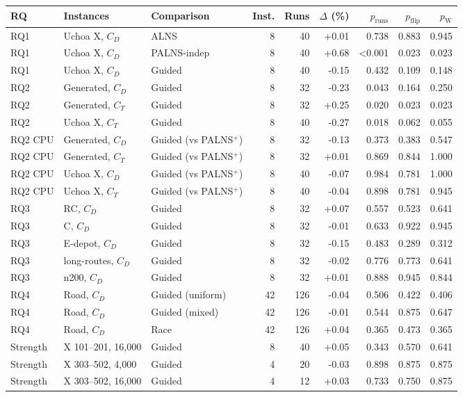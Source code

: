 \begin{tabular}{lllrrrrrr}
\toprule
RQ & Instances & Comparison & Inst. & Runs & $\Delta$ (\%) & $p_{\mathrm{runs}}$ & $p_{\mathrm{flip}}$ & $p_{\mathrm{W}}$ \\
\midrule
RQ1 & Uchoa X, $C_D$ & ALNS & 8 & 40 & +0.01 & 0.738 & 0.883 & 0.945 \\
RQ1 & Uchoa X, $C_D$ & PALNS-indep & 8 & 40 & +0.68 & <0.001 & 0.023 & 0.023 \\
RQ1 & Uchoa X, $C_D$ & Guided & 8 & 40 & -0.15 & 0.432 & 0.109 & 0.148 \\
RQ2 & Generated, $C_D$ & Guided & 8 & 32 & -0.23 & 0.043 & 0.164 & 0.250 \\
RQ2 & Generated, $C_T$ & Guided & 8 & 32 & +0.25 & 0.020 & 0.023 & 0.023 \\
RQ2 & Uchoa X, $C_T$ & Guided & 8 & 40 & -0.27 & 0.018 & 0.062 & 0.055 \\
RQ2 CPU & Generated, $C_D$ & Guided (vs PALNS$^{+}$) & 8 & 32 & -0.13 & 0.373 & 0.383 & 0.547 \\
RQ2 CPU & Generated, $C_T$ & Guided (vs PALNS$^{+}$) & 8 & 32 & +0.01 & 0.869 & 0.844 & 1.000 \\
RQ2 CPU & Uchoa X, $C_D$ & Guided (vs PALNS$^{+}$) & 8 & 40 & -0.07 & 0.984 & 0.781 & 1.000 \\
RQ2 CPU & Uchoa X, $C_T$ & Guided (vs PALNS$^{+}$) & 8 & 40 & -0.04 & 0.898 & 0.781 & 0.945 \\
RQ3 & RC, $C_D$ & Guided & 8 & 32 & +0.07 & 0.557 & 0.523 & 0.641 \\
RQ3 & C, $C_D$ & Guided & 8 & 32 & -0.01 & 0.633 & 0.922 & 0.945 \\
RQ3 & E-depot, $C_D$ & Guided & 8 & 32 & -0.15 & 0.483 & 0.289 & 0.312 \\
RQ3 & long-routes, $C_D$ & Guided & 8 & 32 & -0.02 & 0.776 & 0.773 & 0.641 \\
RQ3 & n200, $C_D$ & Guided & 8 & 32 & +0.01 & 0.888 & 0.945 & 0.844 \\
RQ4 & Road, $C_D$ & Guided (uniform) & 42 & 126 & -0.04 & 0.506 & 0.422 & 0.406 \\
RQ4 & Road, $C_D$ & Guided (mixed) & 42 & 126 & -0.01 & 0.544 & 0.875 & 0.647 \\
RQ4 & Road, $C_D$ & Race & 42 & 126 & +0.04 & 0.365 & 0.473 & 0.365 \\
Strength & X 101--201, 16{,}000 & Guided & 8 & 40 & +0.05 & 0.343 & 0.570 & 0.641 \\
Strength & X 303--502, 4{,}000 & Guided & 4 & 20 & -0.03 & 0.898 & 0.875 & 0.875 \\
Strength & X 303--502, 16{,}000 & Guided & 4 & 12 & +0.03 & 0.733 & 0.750 & 0.875 \\
\bottomrule
\end{tabular}
